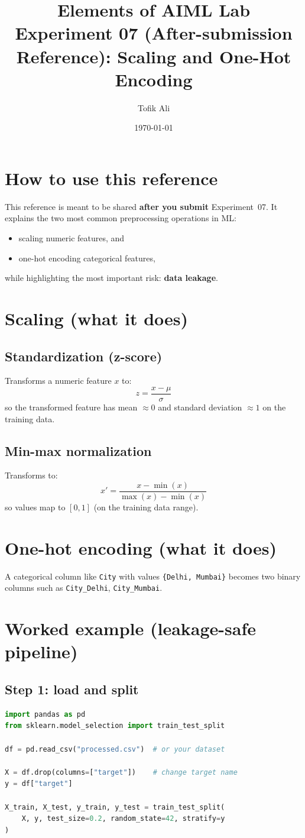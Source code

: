 \documentclass[11pt]{article}
\title{Elements of AIML Lab\\Experiment 07 (After-submission Reference): Scaling and One-Hot Encoding}
\author{Tofik Ali}
\date{\today}
\begin{document}
\maketitle
\tableofcontents

\section{How to use this reference}
This reference is meant to be shared \textbf{after you submit} Experiment~07.
It explains the two most common preprocessing operations in ML:
\begin{itemize}[leftmargin=*]
  \item scaling numeric features, and
  \item one-hot encoding categorical features,
\end{itemize}
while highlighting the most important risk: \textbf{data leakage}.

\section{Scaling (what it does)}
\subsection{Standardization (z-score)}
Transforms a numeric feature $x$ to:
\[
  z = \frac{x - \mu}{\sigma}
\]
so the transformed feature has mean $\approx 0$ and standard deviation $\approx 1$ on the training data.

\subsection{Min-max normalization}
Transforms to:
\[
  x' = \frac{x - \min(x)}{\max(x) - \min(x)}
\]
so values map to $[0,1]$ (on the training data range).

\section{One-hot encoding (what it does)}
A categorical column like \texttt{City} with values \texttt{\{Delhi, Mumbai\}} becomes two binary columns such as \texttt{City\_Delhi}, \texttt{City\_Mumbai}.

\section{Worked example (leakage-safe pipeline)}
\subsection{Step 1: load and split}
\begin{lstlisting}[language=Python]
import pandas as pd
from sklearn.model_selection import train_test_split

df = pd.read_csv("processed.csv")  # or your dataset

X = df.drop(columns=["target"])    # change target name
y = df["target"]

X_train, X_test, y_train, y_test = train_test_split(
    X, y, test_size=0.2, random_state=42, stratify=y
)
\end{lstlisting}
\end{document}
